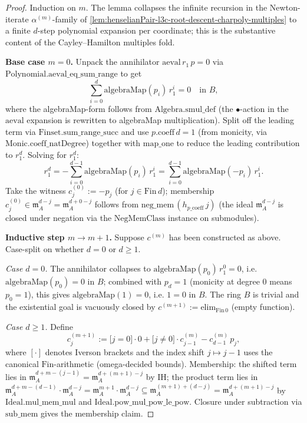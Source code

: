 \begin{proof}

\leanok
Induction on $m$. The lemma collapses the infinite recursion in
the Newton-iterate $\alpha^{(m)}$-family of
\cref{lem:henselianPair-l3c-root-descent-charpoly-multiples} to a
finite $d$-step polynomial expansion per coordinate; this is the
substantive content of the Cayley--Hamilton multiples fold.

\textbf{Base case $m = 0$.} Unpack the annihilator
$\mathrm{aeval}\,r_1\,p = 0$ via
$\mathrm{Polynomial.aeval\_eq\_sum\_range}$ to get
\[
\sum_{i = 0}^{d} \mathrm{algebraMap}(p_i)\,r_1^{i} = 0 \quad\text{in } B,
\]
where the algebraMap-form follows from
$\mathrm{Algebra.smul\_def}$ (the $\bullet$-action in the
$\mathrm{aeval}$ expansion is rewritten to algebraMap
multiplication). Split off the leading term via
$\mathrm{Finset.sum\_range\_succ}$ and use
$p.\mathrm{coeff}\,d = 1$ (from monicity, via
$\mathrm{Monic.coeff\_natDegree}$) together with
$\mathrm{map\_one}$ to reduce the leading contribution to
$r_1^d$. Solving for $r_1^d$:
\[
r_1^d = -\sum_{i = 0}^{d - 1} \mathrm{algebraMap}(p_i)\,r_1^{i}
      = \sum_{i = 0}^{d - 1} \mathrm{algebraMap}(-p_i)\,r_1^{i}.
\]
Take the witness $c^{(0)}_j := -p_j$ (for $j \in \mathrm{Fin}\,d$);
membership $c^{(0)}_j \in \mathfrak m_A^{d - j} = \mathfrak m_A^{d
+ 0 - j}$ follows from $\mathrm{neg\_mem}\,(h_{p\_\mathrm{coeff}}\,j)$
(the ideal $\mathfrak m_A^{d - j}$ is closed under negation via
the $\mathrm{NegMemClass}$ instance on submodules).

\textbf{Inductive step $m \to m + 1$.} Suppose $c^{(m)}$ has been
constructed as above. Case-split on whether $d = 0$ or $d \ge 1$.

\emph{Case $d = 0$.} The annihilator collapses to
$\mathrm{algebraMap}(p_0)\,r_1^0 = 0$, i.e.
$\mathrm{algebraMap}(p_0) = 0$ in $B$; combined with $p_d = 1$
(monicity at degree $0$ means $p_0 = 1$), this gives
$\mathrm{algebraMap}(1) = 0$, i.e. $1 = 0$ in $B$. The ring $B$
is trivial and the existential goal is vacuously closed by
$c^{(m+1)} := \mathrm{elim}_{\mathrm{Fin}\,0}$ (empty function).

\emph{Case $d \ge 1$.} Define
\[
c^{(m+1)}_j :=
\bigl[j = 0\bigr]\cdot 0 + \bigl[j \ne 0\bigr]\cdot c^{(m)}_{j - 1}
- c^{(m)}_{d - 1}\,p_j,
\]
where $[\cdot]$ denotes Iverson brackets and the index shift
$j \mapsto j - 1$ uses the canonical $\mathrm{Fin}$-arithmetic
(omega-decided bounds). Membership: the shifted term lies in
$\mathfrak m_A^{d + m - (j - 1)} = \mathfrak m_A^{d + (m+1) - j}$
by IH; the product term lies in $\mathfrak m_A^{d + m - (d - 1)}
\cdot \mathfrak m_A^{d - j} = \mathfrak m_A^{m + 1} \cdot
\mathfrak m_A^{d - j} \subseteq \mathfrak m_A^{(m+1) + (d - j)} =
\mathfrak m_A^{d + (m+1) - j}$ by $\mathrm{Ideal.mul\_mem\_mul}$
and $\mathrm{Ideal.pow\_mul\_pow\_le\_pow}$. Closure under
subtraction via $\mathrm{sub\_mem}$ gives the membership claim.


\end{proof}
